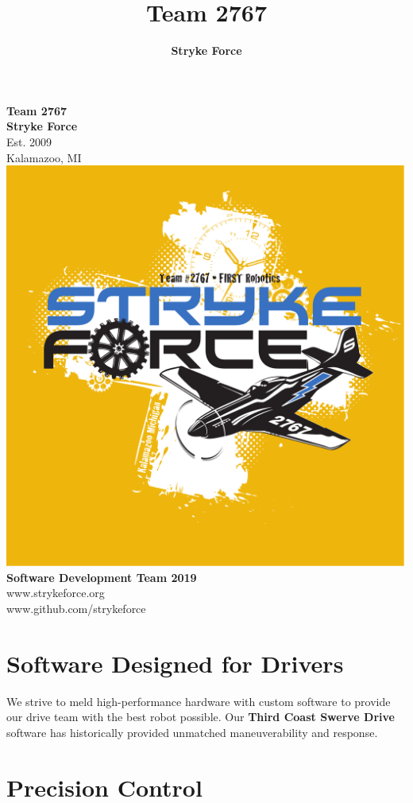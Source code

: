 \documentclass[10pt,tumble]{leaflet}
\title{Team 2767}
\author{\Large\textbf{Stryke Force}}
\begin{document}
\begin{center}
 \LARGE\textbf{Team 2767\\ Stryke Force}\\
 \Large{Est. 2009\\ Kalamazoo, MI}\\
 \vspace{0.5in}
 \includegraphics[scale=0.2]{assets/strykeforce}\\
 \vspace{0.5in}
 \LARGE\textbf{Software Development Team 2019}\vspace{0.25in}\\ www.strykeforce.org\\www.github.com/strykeforce
 \vfill
\end{center}
\clearpage

\section{Software Designed for Drivers}
We strive to meld high-performance hardware with custom software to provide our drive team with the best robot possible. Our \textbf{Third Coast Swerve Drive} software has historically provided unmatched maneuverability and response.

\section{Precision Control}
\end{document}
